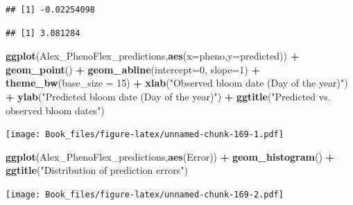 \documentclass[
]{book}
\newenvironment{Shaded}{\begin{snugshade}}{\end{snugshade}}
\newcommand{\DataTypeTok}[1]{\textcolor[rgb]{0.13,0.29,0.53}{#1}}
\newcommand{\DecValTok}[1]{\textcolor[rgb]{0.00,0.00,0.81}{#1}}
\newcommand{\KeywordTok}[1]{\textcolor[rgb]{0.13,0.29,0.53}{\textbf{#1}}}
\newcommand{\NormalTok}[1]{#1}
\newcommand{\OperatorTok}[1]{\textcolor[rgb]{0.81,0.36,0.00}{\textbf{#1}}}
\newcommand{\StringTok}[1]{\textcolor[rgb]{0.31,0.60,0.02}{#1}}
\begin{document}
\begin{verbatim}
## [1] -0.02254098
\end{verbatim}

\begin{Shaded}
\end{Shaded}

\begin{verbatim}
## [1] 3.081284
\end{verbatim}

\begin{Shaded}
\begin{Highlighting}[]
\KeywordTok{ggplot}\NormalTok{(Alex_PhenoFlex_predictions,}\KeywordTok{aes}\NormalTok{(}\DataTypeTok{x=}\NormalTok{pheno,}\DataTypeTok{y=}\NormalTok{predicted)) }\OperatorTok{+}
\StringTok{  }\KeywordTok{geom_point}\NormalTok{() }\OperatorTok{+}
\StringTok{  }\KeywordTok{geom_abline}\NormalTok{(}\DataTypeTok{intercept=}\DecValTok{0}\NormalTok{, }\DataTypeTok{slope=}\DecValTok{1}\NormalTok{) }\OperatorTok{+}
\StringTok{  }\KeywordTok{theme_bw}\NormalTok{(}\DataTypeTok{base_size =} \DecValTok{15}\NormalTok{) }\OperatorTok{+}
\StringTok{  }\KeywordTok{xlab}\NormalTok{(}\StringTok{"Observed bloom date (Day of the year)"}\NormalTok{) }\OperatorTok{+}
\StringTok{  }\KeywordTok{ylab}\NormalTok{(}\StringTok{"Predicted bloom date (Day of the year)"}\NormalTok{) }\OperatorTok{+}
\StringTok{  }\KeywordTok{ggtitle}\NormalTok{(}\StringTok{"Predicted vs. observed bloom dates"}\NormalTok{)}
\end{Highlighting}
\end{Shaded}

\texttt{[image: Book\_files/figure-latex/unnamed-chunk-169-1.pdf]}

\begin{Shaded}
\begin{Highlighting}[]
\KeywordTok{ggplot}\NormalTok{(Alex_PhenoFlex_predictions,}\KeywordTok{aes}\NormalTok{(Error)) }\OperatorTok{+}
\StringTok{  }\KeywordTok{geom_histogram}\NormalTok{() }\OperatorTok{+}
\StringTok{  }\KeywordTok{ggtitle}\NormalTok{(}\StringTok{"Distribution of prediction errors"}\NormalTok{)}
\end{Highlighting}
\end{Shaded}

\texttt{[image: Book\_files/figure-latex/unnamed-chunk-169-2.pdf]}
\end{document}
